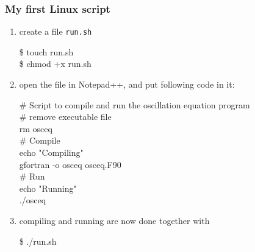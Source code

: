 \documentclass[aspectratio=43,9pt]{beamer}
\begin{document}
%
%
\begin{frame}
	\frametitle{My first Linux script}
	\begin{enumerate}
		\item create a file \texttt{run.sh}
			\par\vspace*{1ex}\hspace*{.05\textwidth}\parbox{.5\textwidth}{\ttfamily
				\$   touch  run.sh\\
				\$   chmod  +x  run.sh
			}\vspace*{1ex}\par
		\item open the file in Notepad++, and put following code in it:
			\par\vspace*{1ex}\hspace*{.05\textwidth}\parbox{.8\textwidth}{\ttfamily\small
				\# Script to compile and run the oscillation equation program\\[3ex]
				\# remove executable file\\
				rm osceq\\[3ex]
				\# Compile\\
				echo "Compiling"\\
				gfortran -o osceq osceq.F90\\[3ex]
				\# Run\\
				echo "Running"\\
				./osceq
			}\vspace*{1ex}\par
		\item compiling and running are now done together with
			\par\vspace*{1ex}\hspace*{.05\textwidth}\parbox{.5\textwidth}{\ttfamily
				\$   ./run.sh
			}\vspace*{1ex}\par
	\end{enumerate}
\end{frame}
%
%
\end{document}
